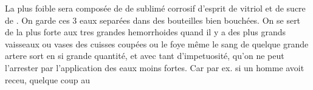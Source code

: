  La plus foible sera compos\'{e}e de  de sublim\'{e} corrosif  d'esprit de vitriol et  de sucre de \saturn. On garde ces 3 eaux separ\'{e}es dans des bouteilles bien bouch\'{e}es. On se sert de la plus forte aux tres grandes hemorrhoides quand il y a des plus grands vaisseaux ou vases des cuisses coup\'{e}es ou le foye m\^{e}me 
le sang de quelque grande artere sort en si grande quantit\'{e}, et avec tant d'impetuosit\'{e}, qu'on ne peut l'arrester par l'application des eaux moins fortes. Car par ex. si un homme avoit receu, quelque coup au%
